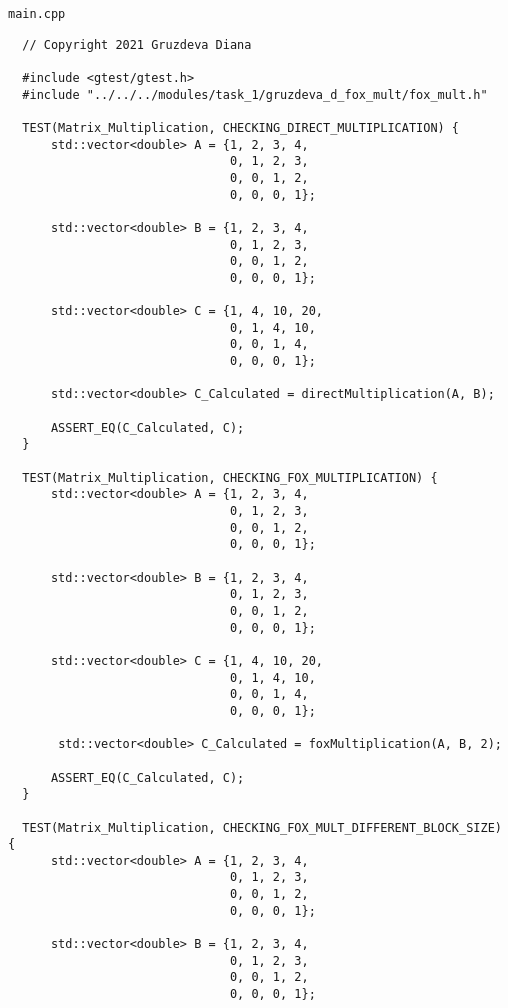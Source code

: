 \documentclass{article}
\begin{document}
\par
\lstinline$main.cpp$
\begin{lstlisting}
  // Copyright 2021 Gruzdeva Diana

  #include <gtest/gtest.h>
  #include "../../../modules/task_1/gruzdeva_d_fox_mult/fox_mult.h"

  TEST(Matrix_Multiplication, CHECKING_DIRECT_MULTIPLICATION) {
      std::vector<double> A = {1, 2, 3, 4,
                               0, 1, 2, 3,
                               0, 0, 1, 2,
                               0, 0, 0, 1};

      std::vector<double> B = {1, 2, 3, 4,
                               0, 1, 2, 3,
                               0, 0, 1, 2,
                               0, 0, 0, 1};

      std::vector<double> C = {1, 4, 10, 20,
                               0, 1, 4, 10,
                               0, 0, 1, 4,
                               0, 0, 0, 1};

      std::vector<double> C_Calculated = directMultiplication(A, B);

      ASSERT_EQ(C_Calculated, C);
  }

  TEST(Matrix_Multiplication, CHECKING_FOX_MULTIPLICATION) {
      std::vector<double> A = {1, 2, 3, 4,
                               0, 1, 2, 3,
                               0, 0, 1, 2,
                               0, 0, 0, 1};

      std::vector<double> B = {1, 2, 3, 4,
                               0, 1, 2, 3,
                               0, 0, 1, 2,
                               0, 0, 0, 1};

      std::vector<double> C = {1, 4, 10, 20,
                               0, 1, 4, 10,
                               0, 0, 1, 4,
                               0, 0, 0, 1};

       std::vector<double> C_Calculated = foxMultiplication(A, B, 2);

      ASSERT_EQ(C_Calculated, C);
  }

  TEST(Matrix_Multiplication, CHECKING_FOX_MULT_DIFFERENT_BLOCK_SIZE) {
      std::vector<double> A = {1, 2, 3, 4,
                               0, 1, 2, 3,
                               0, 0, 1, 2,
                               0, 0, 0, 1};

      std::vector<double> B = {1, 2, 3, 4,
                               0, 1, 2, 3,
                               0, 0, 1, 2,
                               0, 0, 0, 1};


\end{lstlisting}
\end{document}
